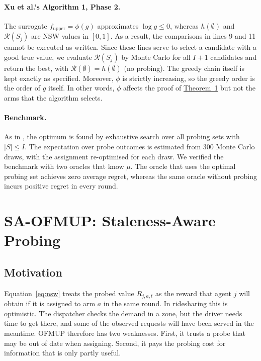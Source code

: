 \documentclass[letterpaper]{article}
\begin{document}
\paragraph{Xu et al.'s Algorithm 1, Phase 2.}
The surrogate $f_{\mathrm{upper}}=\phi(g)$ approximates $\log g\le0$, whereas
$h(\emptyset)$ and $\mathcal{R}(S_j)$ are NSW values in $[0,1]$. As a result, the
comparisons in lines 9 and 11 cannot be executed as written. Since these lines
serve to select a candidate with a good true value, we evaluate
$\mathcal{R}(S_j)$ by Monte Carlo for all $I+1$ candidates and return the best,
with $\mathcal{R}(\emptyset)=h(\emptyset)$ (no probing). The greedy chain itself is
kept exactly as specified. Moreover, $\phi$ is strictly increasing, so the
greedy order is the order of $g$ itself. In other words, $\phi$ affects the
proof of \hyperref[thm:1]{Theorem~1} but not the arms that the algorithm selects.

\paragraph{Benchmark.}
As in \citet{xu2026fair}, the optimum is found by exhaustive search over all
probing sets with $|S|\le I$. The expectation over probe outcomes is estimated
from 300 Monte Carlo draws, with the assignment re-optimised for each draw. We
verified the benchmark with two oracles that know $\mu$. The oracle that uses the
optimal probing set achieves zero average regret, whereas the same oracle
without probing incurs positive regret in every round.

\section{SA-OFMUP: Staleness-Aware Probing}
\label{sec:sa}

\subsection{Motivation}
Equation~\eqref{eq:nsw} treats the probed value $R_{j,a,t}$ as the reward that
agent $j$ will obtain if it is assigned to arm $a$ in the same round. In
ridesharing this is optimistic. The dispatcher checks the demand in a zone, but
the driver needs time to get there, and some of the observed requests will have
been served in the meantime. OFMUP therefore has two weaknesses. First, it
trusts a probe that may be out of date when assigning. Second, it pays the
probing cost for information that is only partly useful.
\end{document}

